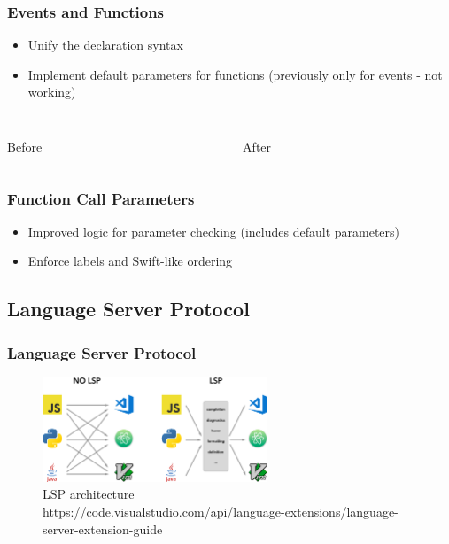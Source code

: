 \documentclass[aspectratio=169]{beamer}
\begin{document}
\begin{frame}
\frametitle{Events and Functions}
\begin{itemize}
    \item Unify the declaration syntax
    \item Implement default parameters for functions (previously only for events - not working)
\end{itemize}
    \begin{columns}
        \begin{column}{0.5\textwidth}
	        \inputminted[fontsize=\small]{swift}{code/events-before.flint}
	        \centering Before
        \end{column}
        \begin{column}{0.5\textwidth}
	        \inputminted[fontsize=\small]{swift}{code/events-after.flint}
	        \centering After
        \end{column}
    \end{columns}
\end{frame}

\begin{frame}
\frametitle{Function Call Parameters}
\begin{itemize}
    \item Improved logic for parameter checking (includes default parameters)
    \item Enforce labels and Swift-like ordering
\end{itemize}
\end{frame}

\subsection{Language Server Protocol}

\begin{frame}
\frametitle{Language Server Protocol}
\begin{figure}
    \centering
    \includegraphics[width=0.6\textwidth]{figures/lsp.png}
    \caption* {LSP architecture \\ \tiny {https://code.visualstudio.com/api/language-extensions/language-server-extension-guide}}
\end{figure}
\end{frame}
\end{document}
